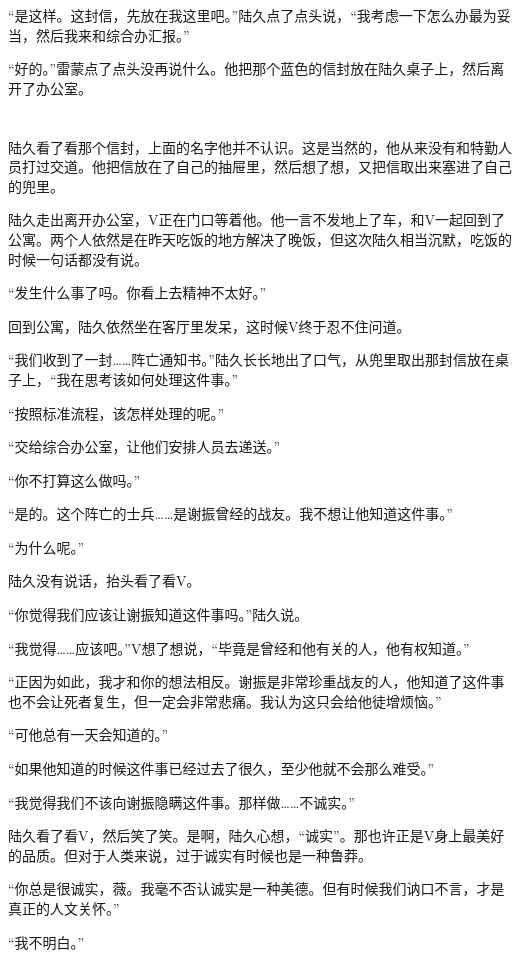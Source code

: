 “是这样。这封信，先放在我这里吧。”陆久点了点头说，“我考虑一下怎么办最为妥当，然后我来和综合办汇报。”

“好的。”雷蒙点了点头没再说什么。他把那个蓝色的信封放在陆久桌子上，然后离开了办公室。

\section*{}

陆久看了看那个信封，上面的名字他并不认识。这是当然的，他从来没有和特勤人员打过交道。他把信放在了自己的抽屉里，然后想了想，又把信取出来塞进了自己的兜里。

陆久走出离开办公室，V正在门口等着他。他一言不发地上了车，和V一起回到了公寓。两个人依然是在昨天吃饭的地方解决了晚饭，但这次陆久相当沉默，吃饭的时候一句话都没有说。

“发生什么事了吗。你看上去精神不太好。”

回到公寓，陆久依然坐在客厅里发呆，这时候V终于忍不住问道。

“我们收到了一封……阵亡通知书。”陆久长长地出了口气，从兜里取出那封信放在桌子上，“我在思考该如何处理这件事。”

“按照标准流程，该怎样处理的呢。”

“交给综合办公室，让他们安排人员去递送。”

“你不打算这么做吗。”

“是的。这个阵亡的士兵……是谢振曾经的战友。我不想让他知道这件事。”

“为什么呢。”

陆久没有说话，抬头看了看V。

“你觉得我们应该让谢振知道这件事吗。”陆久说。

“我觉得……应该吧。”V想了想说，“毕竟是曾经和他有关的人，他有权知道。”

“正因为如此，我才和你的想法相反。谢振是非常珍重战友的人，他知道了这件事也不会让死者复生，但一定会非常悲痛。我认为这只会给他徒增烦恼。”

“可他总有一天会知道的。”

“如果他知道的时候这件事已经过去了很久，至少他就不会那么难受。”

“我觉得我们不该向谢振隐瞒这件事。那样做……不诚实。”

陆久看了看V，然后笑了笑。是啊，陆久心想，“诚实”。那也许正是V身上最美好的品质。但对于人类来说，过于诚实有时候也是一种鲁莽。

“你总是很诚实，薇。我毫不否认诚实是一种美德。但有时候我们讷口不言，才是真正的人文关怀。”

“我不明白。”

